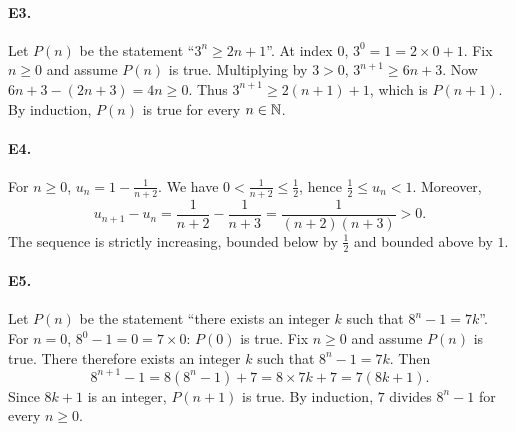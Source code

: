 \paragraph{E3.}Let $P(n)$ be the statement ``$3^n\ge2n+1$''. At index $0$, $3^0=1=2\times0+1$.
Fix $n\ge0$ and assume $P(n)$ is true. Multiplying by $3>0$, $3^{n+1}\ge6n+3$. Now $6n+3-(2n+3)=4n\ge0$. Thus $3^{n+1}\ge2(n+1)+1$, which is $P(n+1)$. By induction, $P(n)$ is true for every $n\in\mathbb N$.

\paragraph{E4.}For $n\ge0$, $u_n=1-\frac{1}{n+2}$. We have $0<\frac{1}{n+2}\le\frac{1}{2}$, hence $\frac{1}{2}\le u_n<1$. Moreover,
\[u_{n+1}-u_n=\frac1{n+2}-\frac1{n+3}=\frac1{(n+2)(n+3)}>0.\]
The sequence is strictly increasing, bounded below by $\frac{1}{2}$ and bounded above by $1$.

\paragraph{E5.}Let $P(n)$ be the statement ``there exists an integer $k$ such that $8^n-1=7k$''. For $n=0$, $8^0-1=0=7\times0$: $P(0)$ is true.
Fix $n\ge0$ and assume $P(n)$ is true. There therefore exists an integer $k$ such that $8^n-1=7k$. Then
\[8^{n+1}-1=8(8^n-1)+7=8\times7k+7=7(8k+1).\]
Since $8k+1$ is an integer, $P(n+1)$ is true. By induction, $7$ divides $8^n-1$ for every $n\ge0$.

